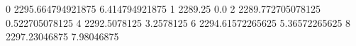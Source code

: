 0 2295.664794921875 6.414794921875
1 2289.25 0.0
2 2289.772705078125 0.522705078125
4 2292.5078125 3.2578125
6 2294.61572265625 5.36572265625
8 2297.23046875 7.98046875
